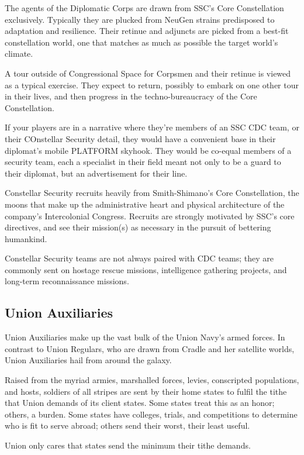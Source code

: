 The agents of the Diplomatic Corps are drawn from SSC’s Core Constellation exclusively.
Typically they are plucked from NeuGen strains predisposed to adaptation and resilience. Their
retinue and adjuncts are picked from a best-fit constellation world, one that matches as much as
possible the target world’s climate.

A tour outside of Congressional Space for Corpsmen and their retinue is viewed as a typical
exercise. They expect to return, possibly to embark on one other tour in their lives, and then
progress in the techno-bureaucracy of the Core Constellation.

If your players are in a narrative where they’re members of an SSC CDC team, or their COnstellar
Security detail, they would have  a convenient base in their diplomat’s mobile PLATFORM
skyhook. They would be co-equal members of a security team, each a specialist in their field
meant not only to be a guard to their diplomat, but an advertisement for their line.

Constellar Security recruits heavily from Smith-Shimano’s Core Constellation, the moons that
make up the administrative heart and physical architecture of the company’s Intercolonial
Congress. Recruits are strongly motivated by SSC’s core directives, and see their mission(s) as
necessary in the pursuit of bettering humankind.

Constellar Security teams are not always paired with CDC teams; they are commonly sent on
hostage rescue missions, intelligence gathering projects, and long-term reconnaissance missions.

\subsection{Union Auxiliaries}

Union Auxiliaries make up the vast bulk of the Union Navy’s armed forces. In contrast to Union
Regulars, who are drawn from Cradle and her satellite worlds, Union Auxiliaries hail from around
the galaxy.

Raised from the myriad armies, marshalled forces, levies, conscripted populations, and hosts,
soldiers of all stripes are sent by their home states to fulfil the tithe that Union demands of its
client states. Some states treat this as an honor; others, a burden. Some states have colleges,
trials, and competitions to determine who is fit to serve abroad; others send their worst, their
least useful.

Union only cares that states send the minimum their tithe demands.

